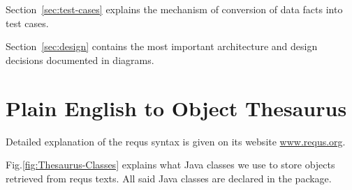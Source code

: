 \documentclass[12pt,oneside,letterpaper]{article}
\begin{document}
    Section~\ref{sec:test-cases} explains the mechanism of conversion
    of data facts into test cases.

    Section~\ref{sec:design} contains the most important architecture
    and design decisions documented in diagrams.





\section{Plain English to Object Thesaurus}
\label{sec:to-objects}

    Detailed explanation of the requs syntax is given on its
    website \href{http://www.requs.org/syntax.html}{www.requs.org}.

    Fig.\ref{fig:Thesaurus-Classes} explains what Java classes we use
    to store objects retrieved from requs texts. All said Java classes
    are declared in the
     package.
\end{document}
